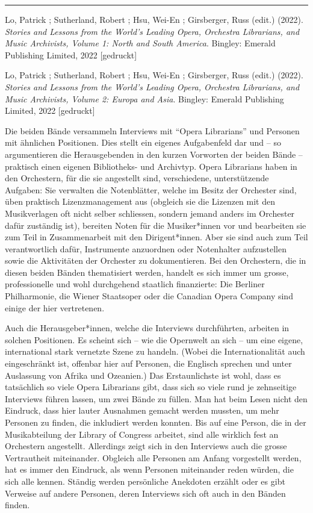\documentclass[a4paper,
fontsize=11pt,
oneside,
numbers=noperiodatend,
parskip=half-,
bibliography=totoc,
final
]{scrartcl}
\begin{document}
\begin{center}\rule{0.5\linewidth}{0.5pt}\end{center}

Lo, Patrick ; Sutherland, Robert ; Hsu, Wei-En ; Girsberger, Russ
(edit.) (2022). \emph{Stories and Lessons from the World's Leading
Opera, Orchestra Librarians, and Music Archivists, Volume 1: North and
South America}. Bingley: Emerald Publishing Limited, 2022 {[}gedruckt{]}

Lo, Patrick ; Sutherland, Robert ; Hsu, Wei-En ; Girsberger, Russ
(edit.) (2022). \emph{Stories and Lessons from the World's Leading
Opera, Orchestra Librarians, and Music Archivists, Volume 2: Europa and
Asia}. Bingley: Emerald Publishing Limited, 2022 {[}gedruckt{]}

Die beiden Bände versammeln Interviews mit \enquote{Opera Librarians}
und Personen mit ähnlichen Positionen. Dies stellt ein eigenes
Aufgabenfeld dar und -- so argumentieren die Herausgebenden in den
kurzen Vorworten der beiden Bände -- praktisch einen eigenen
Bibliotheks- und Archivtyp. Opera Librarians haben in den Orchestern,
für die sie angestellt sind, verschiedene, unterstützende Aufgaben: Sie
verwalten die Notenblätter, welche im Besitz der Orchester sind, üben
praktisch Lizenzmanagement aus (obgleich sie die Lizenzen mit den
Musikverlagen oft nicht selber schliessen, sondern jemand anders im
Orchester dafür zuständig ist), bereiten Noten für die Musiker*innen vor
und bearbeiten sie zum Teil in Zusammenarbeit mit den Dirigent*innen.
Aber sie sind auch zum Teil verantwortlich dafür, Instrumente anzuordnen
oder Notenhalter aufzustellen sowie die Aktivitäten der Orchester zu
dokumentieren. Bei den Orchestern, die in diesen beiden Bänden
thematisiert werden, handelt es sich immer um grosse, professionelle und
wohl durchgehend staatlich finanzierte: Die Berliner Philharmonie, die
Wiener Staatsoper oder die Canadian Opera Company sind einige der hier
vertretenen.

Auch die Herausgeber*innen, welche die Interviews durchführten, arbeiten
in solchen Positionen. Es scheint sich -- wie die Opernwelt an sich --
um eine eigene, international stark vernetzte Szene zu handeln. (Wobei
die Internationalität auch eingeschränkt ist, offenbar hier auf
Personen, die Englisch sprechen und unter Auslassung von Afrika und
Ozeanien.) Das Erstaunlichste ist wohl, dass es tatsächlich so viele
Opera Librarians gibt, dass sich so viele rund je zehnseitige Interviews
führen lassen, um zwei Bände zu füllen. Man hat beim Lesen nicht den
Eindruck, dass hier lauter Ausnahmen gemacht werden mussten, um mehr
Personen zu finden, die inkludiert werden konnten. Bis auf eine Person,
die in der Musikabteilung der Library of Congress arbeitet, sind alle
wirklich fest an Orchestern angestellt. Allerdings zeigt sich in den
Interviews auch die grosse Vertrautheit miteinander. Obgleich alle
Personen am Anfang vorgestellt werden, hat es immer den Eindruck, als
wenn Personen miteinander reden würden, die sich alle kennen. Ständig
werden persönliche Anekdoten erzählt oder es gibt Verweise auf andere
Personen, deren Interviews sich oft auch in den Bänden finden.
\end{document}
